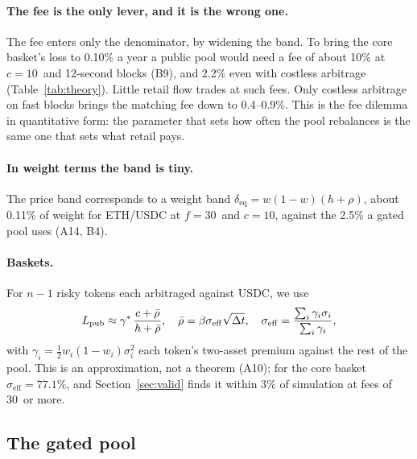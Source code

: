 \paragraph{The fee is the only lever, and it is the wrong one.} The fee enters only the denominator, by widening the band. To bring the core basket's loss to 0.10\% a year a public pool would need a fee of about 10\% at $c=10$\bps\ and 12-second blocks (B9), and 2.2\% even with costless arbitrage (Table~\ref{tab:theory}). Little retail flow trades at such fees. Only costless arbitrage on fast blocks brings the matching fee down to 0.4--0.9\%. This is the fee dilemma in quantitative form: the parameter that sets how often the pool rebalances is the same one that sets what retail pays.

\paragraph{In weight terms the band is tiny.} The price band corresponds to a weight band $\delta_{\mathrm{eq}}=w(1-w)(h+\rho)$, about 0.11\% of weight for ETH/USDC at $f=30$\bps\ and $c=10$\bps, against the 2.5\% a gated pool uses (A14, B4).

\paragraph{Baskets.} For $n-1$ risky tokens each arbitraged against USDC, we use
\begin{equation}
L_{\mathrm{pub}}\approx\gamma^{*}\,\frac{c+\bar\rho}{h+\bar\rho},\quad \bar\rho=\beta\sigma_{\mathrm{eff}}\sqrt{\Delta t},\quad \sigma_{\mathrm{eff}}=\frac{\sum_i\gamma_i\sigma_i}{\sum_i\gamma_i},
\label{eq:pubn}
\end{equation}
with $\gamma_i=\tfrac12w_i(1-w_i)\sigma_i^2$ each token's two-asset premium against the rest of the pool. This is an approximation, not a theorem (A10); for the core basket $\sigma_{\mathrm{eff}}=77.1\%$, and Section~\ref{sec:valid} finds it within 3\% of simulation at fees of 30\bps\ or more.

\subsection{The gated pool}
\label{sec:gated}

